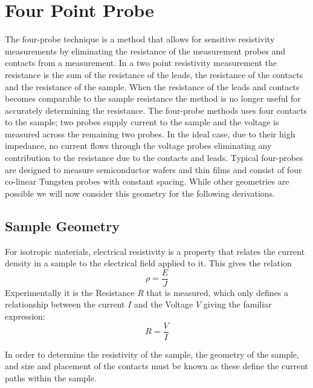 
\chapter{Four Point Probe}

    
    The four-probe technique is a method that allows for sensitive resistivity measurements by eliminating the resistance of the measurement probes and contacts from a measurement. In a two point resistivity measurement the resistance is the sum of the resistance of the leads, the resistance of the contacts and the resistance of the sample. %
    When the resistance of the leads and contacts becomes comparable to the sample resistance the method is no longer useful for accurately determining the resistance. The four-probe methods uses four contacts to the sample; two probes supply current to the sample and the voltage is measured across the remaining two probes. In the ideal case, due to their high impedance, no current flows through the voltage probes eliminating any contribution to the resistance due to the contacts and leads. Typical four-probes are designed to measure semiconductor wafers and thin films and consist of four co-linear Tungsten probes with constant spacing. While other geometries are possible %
    we will now consider this geometry for the following derivations. 
    
 \section{Sample Geometry}
 
    For isotropic materials, electrical resistivity is a property that relates the current density in a sample to the electrical field applied to it. This gives the relation \begin{equation}
        \rho = \frac{E}{J}
    \end{equation}
    Experimentally it is the Resistance $R$ that is measured, which only defines a relationship between the current $I$ and the Voltage $V$ giving the familiar expression: \begin{equation}
        R = \frac{V}{I}
    \end{equation}
    
    In order to determine the resistivity of the sample, the geometry of the sample, and size and placement of the contacts must be known as these define the current paths within the sample. 
    
